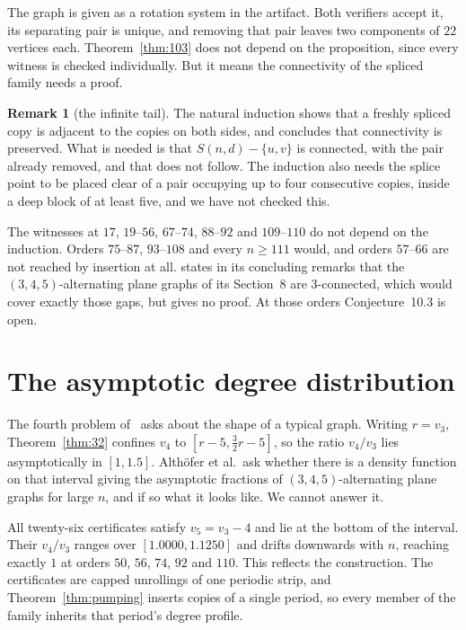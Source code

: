 \documentclass[11pt,a4paper]{amsart}
\theoremstyle{plain}
\theoremstyle{definition}
\newtheorem{remark}[theorem]{Remark}
\begin{document}
The graph is given as a rotation system in the artifact. Both verifiers accept
it, its separating pair is unique, and removing that pair leaves two components
of $22$ vertices each. Theorem~\ref{thm:103} does not depend on the proposition,
since every witness is checked individually. But it means the connectivity of
the spliced family needs a proof.

\begin{remark}[the infinite tail]\label{rem:103gap}
The natural induction shows that a freshly spliced copy is adjacent to the
copies on both sides, and concludes that connectivity is preserved. What is
needed is that $S(n,d) - \{u,v\}$ is connected, with the pair already removed,
and that does not follow. The induction also needs the splice point to be placed
clear of a pair occupying up to four consecutive copies, inside a deep block of
at least five, and we have not checked this.

The witnesses at $17$, $19$--$56$, $67$--$74$, $88$--$92$ and $109$--$110$ do
not depend on the induction. Orders $75$--$87$, $93$--$108$ and every
$n \ge 111$ would, and orders $57$--$66$ are not reached by insertion at all. \cite{AHSSV2015} states in its concluding remarks that the
$(3,4,5)$-alternating plane graphs of its Section~8 are $3$-connected, which
would cover exactly those gaps, but gives no proof. At those orders
Conjecture~10.3 is open.
\end{remark}

\section{The asymptotic degree distribution}\label{sec:density}

The fourth problem of~\cite[\S10]{AHSSV2015} asks about the shape of a typical
graph. Writing $r = v_3$, Theorem~\ref{thm:32} confines $v_4$ to
$[r-5, \tfrac32 r - 5]$, so the ratio $v_4/v_3$ lies asymptotically in
$[1, 1.5]$. Alth\"ofer et al.\ ask whether there is a density function on that
interval giving the asymptotic fractions of $(3,4,5)$-alternating plane graphs
for large $n$, and if so what it looks like. We cannot answer it.

All twenty-six certificates satisfy $v_5 = v_3 - 4$ and lie at the bottom of
the interval. Their $v_4/v_3$ ranges over $[1.0000, 1.1250]$ and drifts downwards
with $n$, reaching exactly $1$ at orders $50$, $56$, $74$, $92$ and $110$. This
reflects the construction. The certificates are capped unrollings of one
periodic strip, and Theorem~\ref{thm:pumping} inserts copies of a single period,
so every member of the family inherits that period's degree profile.
\end{document}
